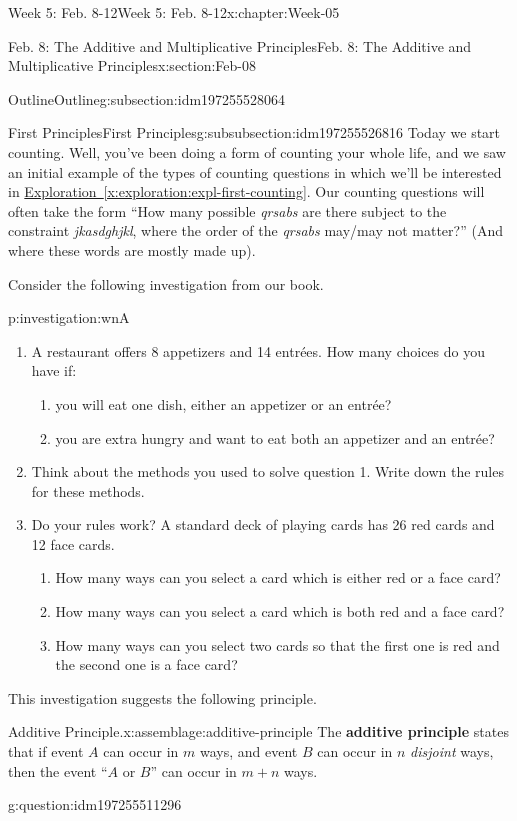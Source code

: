 \documentclass[oneside,10pt,]{book}
\newcommand{\xreffont}{\relax}
\newcommand{\terminology}[1]{\textbf{#1}}
\numberwithin{equation}{section}
\begin{document}
\begin{chapterptx}{Week 5: Feb. 8-12}{}{Week 5: Feb. 8-12}{}{}{x:chapter:Week-05}
\begin{sectionptx}{Feb. 8: The Additive and Multiplicative Principles}{}{Feb. 8: The Additive and Multiplicative Principles}{}{}{x:section:Feb-08}
\begin{subsectionptx}{Outline}{}{Outline}{}{}{g:subsection:idm197255528064}
\begin{subsubsectionptx}{First Principles}{}{First Principles}{}{}{g:subsubsection:idm197255526816}
Today we start counting. Well, you've been doing a form of counting your whole life, and we saw an initial example of the types of counting questions in which we'll be interested in \hyperref[x:exploration:expl-first-counting]{Exploration~{\xreffont\ref{x:exploration:expl-first-counting}}}. Our counting questions will often take the form ``How many possible \emph{qrsabs} are there subject to the constraint \emph{jkasdghjkl}, where the order of the \emph{qrsabs} may\slash{}may not matter?'' (And where these words are mostly made up).%
\par
Consider the following investigation from our book.%
\begin{investigation}{}{p:investigation:wnA}%
%
\begin{enumerate}
\item{}A restaurant offers 8 appetizers and 14 entrées. How many choices do you have if:%
\begin{enumerate}
\item{}you will eat one dish, either an appetizer or an entrée?%
\item{}you are extra hungry and want to eat both an appetizer and an entrée?%
\end{enumerate}
%
\item{}Think about the methods you used to solve question 1. Write down the rules for these methods.%
\item{}Do your rules work? A standard deck of playing cards has 26 red cards and 12 face cards.%
\begin{enumerate}
\item{}How many ways can you select a card which is either red or a face card?%
\item{}How many ways can you select a card which is both red and a face card?%
\item{}How many ways can you select two cards so that the first one is red and the second one is a face card?%
\end{enumerate}
%
\end{enumerate}
%
\end{investigation}%
This investigation suggests the following principle.%
\begin{assemblage}{Additive Principle.}{x:assemblage:additive-principle}%
The \terminology{additive principle} states that if event \(A\) can occur in \(m\) ways, and event \(B\) can occur in \(n\) \emph{disjoint} ways, then the event ``\(A\) or \(B\)'' can occur in \(m + n\) ways.%
\end{assemblage}
\begin{question}{}{g:question:idm197255511296}%

\end{question}
\end{subsubsectionptx}
\end{subsectionptx}
\end{sectionptx}
\end{chapterptx}
\end{document}
